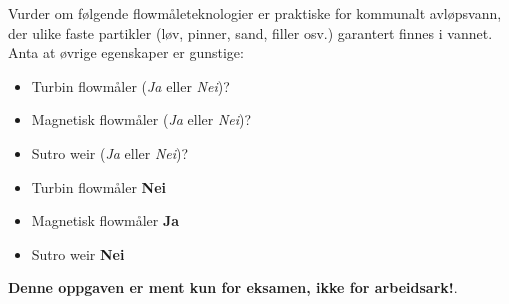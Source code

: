 

Vurder om følgende flowmåleteknologier er praktiske for kommunalt avløpsvann, der ulike faste partikler (løv, pinner, sand, filler osv.) garantert finnes i vannet. Anta at øvrige egenskaper er gunstige:

\begin{itemize}
\item{} Turbin flowmåler ({\it Ja} eller {\it Nei})?
\vskip 10pt
\item{} Magnetisk flowmåler ({\it Ja} eller {\it Nei})?
\vskip 10pt
\item{} Sutro weir ({\it Ja} eller {\it Nei})?
\end{itemize}







\begin{itemize}
\item{} Turbin flowmåler {\bf Nei}
\item{} Magnetisk flowmåler {\bf Ja}
\item{} Sutro weir {\bf Nei}
\end{itemize}







{\bf Denne oppgaven er ment kun for eksamen, ikke for arbeidsark!}.


